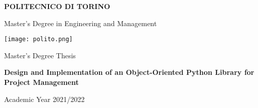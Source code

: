 \begin{titlepage}
  \begin{center}

    \LARGE
    \textbf{POLITECNICO DI TORINO}

    \vspace{0.5cm}
    \large
    Master's Degree in Engineering and Management

    \vspace{0.5cm}

    \texttt{[image: polito.png]}

    \vspace{0.5cm}
    Master's Degree Thesis

    \vspace{1cm}

    \Large
    \textbf{Design and Implementation of an Object-Oriented Python Library for Project Management}

    \vspace{1.5cm}

    \large
    \hfill

    \vfill

    Academic Year 2021/2022

  \end{center}
\end{titlepage}